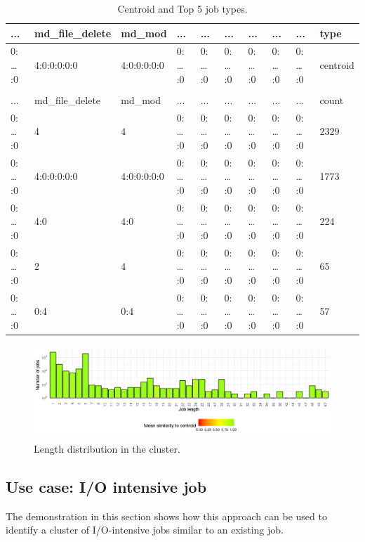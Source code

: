 \documentclass[]{llncs}
\begin{document}
\begin{table}
  \centering
  \begin{tabular}{@{ }l@{ }@{ }l@{ }@{ }l@{ }@{ }l@{ }@{ }l@{ }@{ }l@{ }@{ }l@{ }@{ }l@{ }@{ }l@{ }@{ }l@{ }}
    ...     & md\_file\_delete & md\_mod     & ...     & ...     & ...     & ...     & ...     & ...     & type     \\ 
    \hline
    0: … :0 & 4:0:0:0:0:0      & 4:0:0:0:0:0 & 0: … :0 & 0: … :0 & 0: … :0 & 0: … :0 & 0: … :0 & 0: … :0 & centroid \\ 
    &                  &             &         &         &         &         &         &         &          \\ 
    ...     & md\_file\_delete & md\_mod     & ...     & ...     & ...     & ...     & ...     & ...     & count    \\ 
    \hline
    0: … :0 & 4                & 4           & 0: … :0 & 0: … :0 & 0: … :0 & 0: … :0 & 0: … :0 & 0: … :0 & 2329     \\ 
    0: … :0 & 4:0:0:0:0:0      & 4:0:0:0:0:0 & 0: … :0 & 0: … :0 & 0: … :0 & 0: … :0 & 0: … :0 & 0: … :0 & 1773     \\ 
    0: … :0 & 4:0              & 4:0         & 0: … :0 & 0: … :0 & 0: … :0 & 0: … :0 & 0: … :0 & 0: … :0 & 224      \\ 
    0: … :0 & 2                & 4           & 0: … :0 & 0: … :0 & 0: … :0 & 0: … :0 & 0: … :0 & 0: … :0 & 65       \\ 
    0: … :0 & 0:4              & 0:4         & 0: … :0 & 0: … :0 & 0: … :0 & 0: … :0 & 0: … :0 & 0: … :0 & 57       \\ 
  \end{tabular}
  \caption{Centroid and Top 5 job types.}
  \label{fig:pm_quant:top_jobs}
\end{table}

\begin{figure}
  \centering
  \includegraphics[width=4.61in,height=1.39in]{./media/image21.png}
  \caption{Length distribution in the cluster.}
  \label{fig:pm_quant:length}
\end{figure}

\subsection{Use case: I/O intensive job}
The demonstration in this section shows how this approach can be used to identify a cluster of I/O-intensive jobs similar to an existing job.
\end{document}
